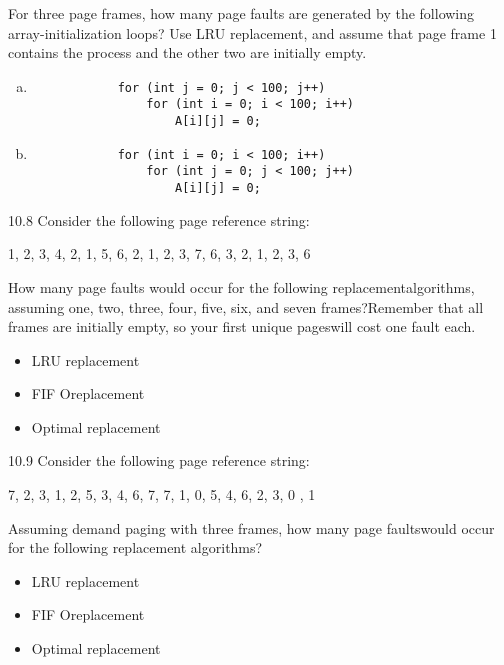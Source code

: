 \documentclass[12pt,a4paper]{article}
\newenvironment{problems}{\begin{list}{}{\renewcommand{\makelabel}[1]{\textbf{##1}\hfil}}}{\end{list}}
\begin{document}
\begin{problems}
    For three page frames, how many page faults are generated by the following array-initialization loops? Use LRU replacement, and assume
    that page frame 1 contains the process and the other two are initially empty.
    \begin{enumerate}[a.]
        \item \begin{verbatim}
            for (int j = 0; j < 100; j++)
                for (int i = 0; i < 100; i++)
                    A[i][j] = 0;
        \end{verbatim}
        \item \begin{verbatim}
            for (int i = 0; i < 100; i++)
                for (int j = 0; j < 100; j++)
                    A[i][j] = 0;
        \end{verbatim}
    \end{enumerate}
    \item[10.8] Consider the following page reference string:
    \begin{center}
        1, 2, 3, 4, 2, 1, 5, 6, 2, 1, 2, 3, 7, 6, 3, 2, 1, 2, 3, 6
    \end{center}
    How many page faults would occur for the following replacementalgorithms, assuming one, two, three, four, five, six, and seven frames?Remember that all frames are initially empty, so your first unique pageswill cost one fault each.
    \begin{itemize}
        \item LRU replacement
        \item FIF Oreplacement
        \item Optimal replacement
    \end{itemize}
    \item[10.9]  Consider the following page reference string:
    \begin{center}
        7, 2, 3, 1, 2, 5, 3, 4, 6, 7, 7, 1, 0, 5, 4, 6, 2, 3, 0 , 1
    \end{center} 
    Assuming demand paging with three frames, how many page faultswould occur for the following replacement algorithms?
    \begin{itemize}
        \item LRU replacement
        \item FIF Oreplacement
        \item Optimal replacement
    \end{itemize}
\end{problems}
\end{document}
